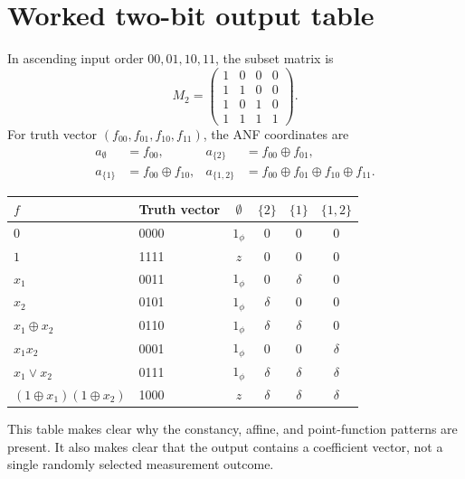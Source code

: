 \documentclass[11pt,a4paper]{article}
\theoremstyle{definition}\newtheorem{definition}[theorem]{Definition}
\theoremstyle{remark}\newtheorem{remark}[theorem]{Remark}
\newcommand{\one}{1_{\phi}}
\numberwithin{equation}{section}
\begin{document}
\section{Worked two-bit output table}\label{app:worked}
In ascending input order $00,01,10,11$, the subset matrix is
\begin{equation}
 M_2=\begin{pmatrix}1&0&0&0\\1&1&0&0\\1&0&1&0\\1&1&1&1\end{pmatrix}.
\end{equation}
For truth vector $(f_{00},f_{01},f_{10},f_{11})$, the ANF coordinates are
\begin{align}
 a_\emptyset&=f_{00},& a_{\{2\}}&=f_{00}\oplus f_{01},\\
 a_{\{1\}}&=f_{00}\oplus f_{10},&a_{\{1,2\}}&=f_{00}\oplus f_{01}\oplus f_{10}\oplus f_{11}.
\end{align}
\begin{center}\small
\begin{tabular}{@{}llcccc@{}}\toprule
$f$ & Truth vector & $\emptyset$ & $\{2\}$ & $\{1\}$ & $\{1,2\}$\\\midrule
$0$ & 0000 & $\one$ & 0 & 0 & 0\\
$1$ & 1111 & $z$ & 0 & 0 & 0\\
$x_1$ & 0011 & $\one$ & 0 & $\delta$ & 0\\
$x_2$ & 0101 & $\one$ & $\delta$ & 0 & 0\\
$x_1\oplus x_2$ & 0110 & $\one$ & $\delta$ & $\delta$ & 0\\
$x_1x_2$ & 0001 & $\one$ & 0 & 0 & $\delta$\\
$x_1\lor x_2$ & 0111 & $\one$ & $\delta$ & $\delta$ & $\delta$\\
$(1\oplus x_1)(1\oplus x_2)$ & 1000 & $z$ & $\delta$ & $\delta$ & $\delta$\\\bottomrule
\end{tabular}
\end{center}
This table makes clear why the constancy, affine, and point-function patterns are present. It also makes clear that the output contains a coefficient vector, not a single randomly selected measurement outcome.

\begingroup
\renewcommand*{\bibfont}{\small}
\setlength{\bibitemsep}{3pt}
\printbibliography[heading=bibintoc,title={References}]
\endgroup
\end{document}
